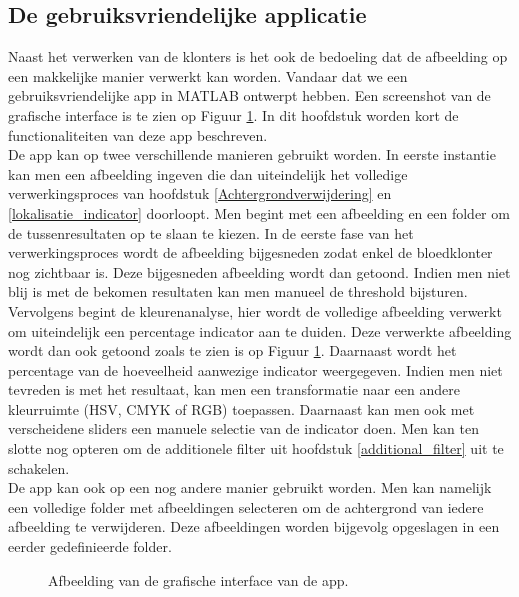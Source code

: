 \documentclass[a4paper,kulak]{kulakarticle}
\begin{document}
\subsection{De gebruiksvriendelijke applicatie}
Naast het verwerken van de klonters is het ook de bedoeling dat de afbeelding op een makkelijke manier verwerkt kan worden. Vandaar dat we een gebruiksvriendelijke app in MATLAB ontwerpt hebben.
Een screenshot van de grafische interface is te zien op Figuur \ref{figuur interface}. In dit hoofdstuk worden kort de functionaliteiten van deze app beschreven.\\
De app kan op twee verschillende manieren gebruikt worden. In eerste instantie kan men een afbeelding ingeven die dan uiteindelijk het volledige verwerkingsproces van hoofdstuk \ref{Achtergrondverwijdering} en \ref{lokalisatie_indicator} doorloopt. Men begint met een afbeelding en een folder om de tussenresultaten op te slaan te kiezen. In de eerste fase van het verwerkingsproces wordt de afbeelding bijgesneden zodat enkel de bloedklonter nog zichtbaar is. Deze bijgesneden afbeelding wordt dan getoond. Indien men niet blij is met de bekomen resultaten kan men manueel de threshold bijsturen. Vervolgens begint de kleurenanalyse, hier wordt de volledige afbeelding verwerkt om uiteindelijk een percentage indicator aan te duiden. Deze verwerkte afbeelding wordt dan ook getoond zoals te zien is op Figuur \ref{figuur interface}. Daarnaast wordt het percentage van de hoeveelheid aanwezige indicator weergegeven. Indien men niet tevreden is met het resultaat, kan men een transformatie naar een andere kleurruimte (HSV, CMYK of RGB) toepassen. Daarnaast kan men ook met verscheidene sliders een manuele selectie van de indicator doen. Men kan ten slotte nog opteren om de additionele filter uit hoofdstuk \ref{additional_filter} uit te schakelen. \\
De app kan ook op een nog andere manier gebruikt worden. Men kan namelijk een volledige folder met afbeeldingen selecteren om de achtergrond van iedere afbeelding te verwijderen. Deze afbeeldingen worden bijgevolg opgeslagen in een eerder gedefinieerde folder.

\begin{figure}[H]
	\centering
	
	\caption{Afbeelding van de grafische interface van de app.}
	\label{figuur interface}
\end{figure}
\end{document}
